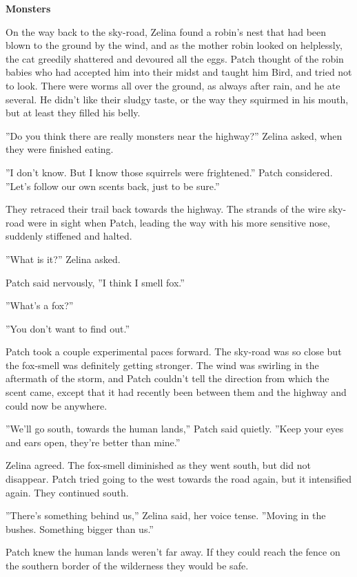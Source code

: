 \documentclass[11pt]{article}
\begin{document}
{\bf Monsters \par
\par
 On the way back to the sky-road, Zelina found a robin's nest that had been blown to the ground by the wind, and as the mother robin looked on helplessly, the cat greedily shattered and devoured all the eggs. Patch thought of the robin babies who had accepted him into their midst and taught him Bird, and tried not to look. There were worms all over the ground, as always after rain, and he ate several. He didn't like their sludgy taste, or the way they squirmed in his mouth, but at least they filled his belly.\par
 ''Do you think there are really monsters near the highway?'' Zelina asked, when they were finished eating.\par
 ''I don't know. But I know those squirrels were frightened.'' Patch considered. ''Let's follow our own scents back, just to be sure.''\par
 They retraced their trail back towards the highway. The strands of the wire sky-road were in sight when Patch, leading the way with his more sensitive nose, suddenly stiffened and halted.\par
 ''What is it?'' Zelina asked.\par
 Patch said nervously, ''I think I smell fox.''\par
 ''What's a fox?''\par
 ''You don't want to find out.''\par
}Patch took a couple experimental paces forward. The sky-road was so close %
 but the fox-smell was definitely getting stronger. The wind was swirling in the aftermath of the storm, and Patch couldn't tell the direction from which the scent came, except that it had recently been between them and the highway %
 and could now be anywhere.\par
''We'll go south, towards the human lands,'' Patch said quietly. ''Keep your eyes and ears open, they're better than mine.''\par
Zelina agreed. The fox-smell diminished as they went south, but did not disappear. Patch tried going to the west towards the road again, but it intensified again. They continued south.\par
''There's something behind us,'' Zelina said, her voice tense. ''Moving in the bushes. Something bigger than us.''\par
Patch knew the human lands weren't far away. If they could reach the fence on the southern border of the wilderness they would be safe.\par
\end{document}
